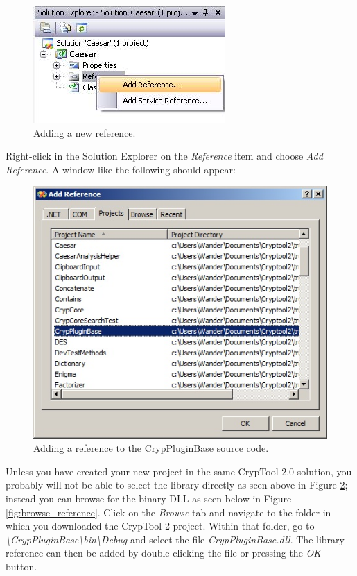\begin{figure}[h!]
	\includegraphics{figures/add_reference.jpg}
	\caption{Adding a new reference.}
	\label{fig:add_reference}
\end{figure}

\noindent Right-click in the Solution Explorer on the \textit{Reference} item and choose \textit{Add Reference}. A window like the following should appear:

\begin{figure}[h!]
	\centering
		\includegraphics{figures/add_pluginbase_source.jpg}
	\caption{Adding a reference to the CrypPluginBase source code.}
	\label{fig:add_pluginbase_source}
\end{figure}
\clearpage

Unless you have created your new project in the same CrypTool 2.0 solution, you probably will not be able to select the library directly as seen above in Figure \ref{fig:add_pluginbase_source}; instead you can browse for the binary DLL as seen below in Figure \ref{fig:browse_reference}. Click on the \textit{Browse} tab and navigate to the folder in which you downloaded the CrypTool 2 project. Within that folder, go to \textit{\textbackslash CrypPluginBase\textbackslash bin\textbackslash Debug} and select the file \textit{CrypPluginBase.dll}. The library reference can then be added by double clicking the file or pressing the \textit{OK} button.

